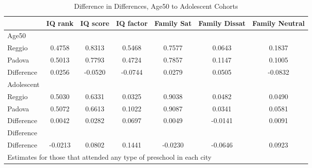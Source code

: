\begin{table}[htbp]\centering
\caption{Difference in Differences, Age50 to Adolescent Cohorts}
\begin{tabular}{l*{6}{c}}
\hline\hline
            &     IQ rank&    IQ score&   IQ factor&  Family Sat&Family Dissat&Family Neutral\\
\hline
Age50       &            &            &            &            &            &            \\
Reggio      &      0.4758&      0.8313&      0.5468&      0.7577&      0.0643&      0.1837\\
Padova      &      0.5013&      0.7793&      0.4724&      0.7857&      0.1147&      0.1005\\
Difference  &      0.0256&     -0.0520&     -0.0744&      0.0279&      0.0505&     -0.0832\\
\hline
Adolescent  &            &            &            &            &            &            \\
Reggio      &      0.5030&      0.6331&      0.0325&      0.9038&      0.0482&      0.0490\\
Padova      &      0.5072&      0.6613&      0.1022&      0.9087&      0.0341&      0.0581\\
Difference  &      0.0042&      0.0282&      0.0697&      0.0049&     -0.0141&      0.0091\\
\hline
Difference  &            &            &            &            &            &            \\
Difference  &     -0.0213&      0.0802&      0.1441&     -0.0230&     -0.0646&      0.0923\\
\hline\hline
\multicolumn{7}{l}{\footnotesize Estimates for those that attended any type of preschool in each city}\\
\end{tabular}
\end{table}
